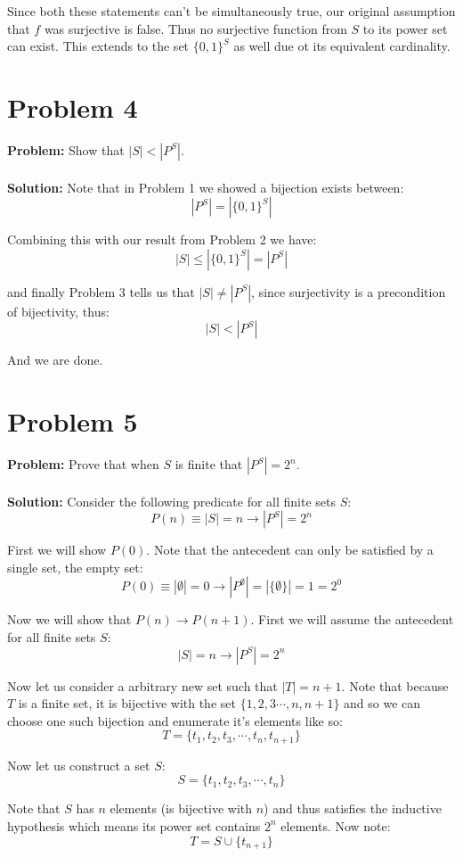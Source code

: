 \documentclass{article}
\begin{document}
Since both these statements can't be simultaneously true, our original assumption that $f$ was surjective is false. Thus no surjective function from $S$ to its power set can exist. This extends to the set $\{0,1\}^S$ as well due ot its equivalent cardinality.

\section*{Problem 4}
\textbf{Problem:} Show that $|S|<|P^S|$.
\\\\
\textbf{Solution:} Note that in Problem 1 we showed a bijection exists between:
$$|P^S|=|\{0,1\}^S|$$

Combining this with our result from Problem 2 we have:
$$|S|\le|\{0,1\}^S|=|P^S|$$

and finally Problem 3 tells us that $|S|\not=|P^S|$, since surjectivity is a precondition of bijectivity, thus:
$$|S|<|P^S|$$

And we are done.

\section*{Problem 5}
\textbf{Problem:} Prove that when $S$ is finite that $|P^S|=2^n$.
\\\\
\textbf{Solution:} Consider the following predicate for all finite sets $S$:
$$P(n)\equiv|S|=n\rightarrow |P^S|=2^n$$

First we will show $P(0)$. Note that the antecedent can only be satisfied by a single set, the empty set:
$$P(0)\equiv|\emptyset|=0\rightarrow |P^\emptyset|=|\{\emptyset\}|=1=2^0$$

Now we will show that $P(n)\rightarrow P(n+1)$. First we will assume the antecedent for all finite sets $S$:
$$|S|=n\rightarrow |P^S|=2^n$$

Now let us consider a arbitrary new set such that $|T|=n+1$. Note that because $T$ is a finite set, it is bijective with the set $\{1,2,3\cdots,n,n+1\}$ and so we can choose one such bijection and enumerate it's elements like so:
$$T=\{t_1,t_2,t_3,\cdots,t_n,t_{n+1}\}$$

Now let us construct a set $S$:
$$S=\{t_1,t_2,t_3,\cdots,t_n\}$$

Note that $S$ has $n$ elements (is bijective with $n$) and thus satisfies the inductive hypothesis which means its power set contains $2^n$ elements. Now note:
$$T=S\cup\{t_{n+1}\}$$
\end{document}
